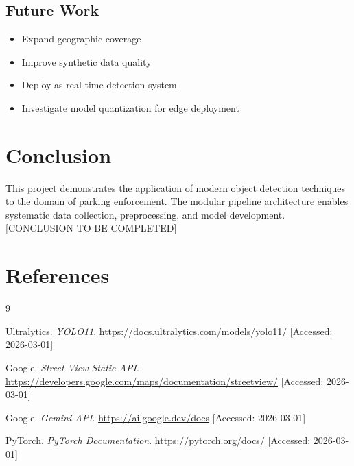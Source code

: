 \documentclass[12pt,a4paper]{article}
\begin{document}
\subsection{Future Work}

\begin{itemize}
	\item Expand geographic coverage
	\item Improve synthetic data quality
	\item Deploy as real-time detection system
	\item Investigate model quantization for edge deployment
\end{itemize}

\section{Conclusion}

This project demonstrates the application of modern object detection techniques to the domain of parking enforcement. The modular pipeline architecture enables systematic data collection, preprocessing, and model development. [CONCLUSION TO BE COMPLETED]

\section*{References}

\begin{thebibliography}{9}

	Ultralytics.
	\textit{YOLO11}.
	\url{https://docs.ultralytics.com/models/yolo11/}
	[Accessed: 2026-03-01]

	Google.
	\textit{Street View Static API}.
	\url{https://developers.google.com/maps/documentation/streetview/}
	[Accessed: 2026-03-01]

	Google.
	\textit{Gemini API}.
	\url{https://ai.google.dev/docs}
	[Accessed: 2026-03-01]

	PyTorch.
	\textit{PyTorch Documentation}.
	\url{https://pytorch.org/docs/}
	[Accessed: 2026-03-01]

\end{thebibliography}
\end{document}
